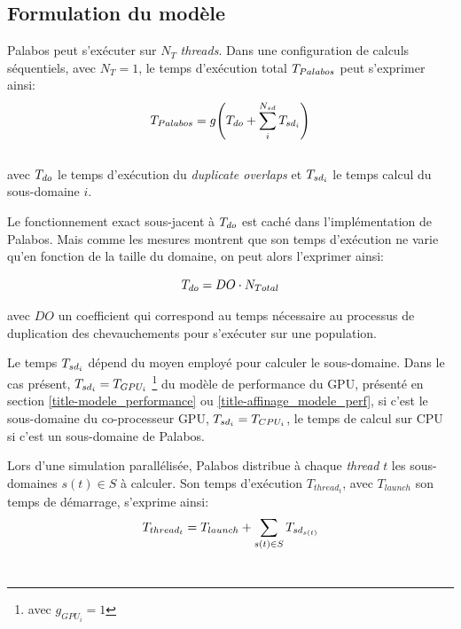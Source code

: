 \subsection{Formulation du modèle}

Palabos peut s'exécuter sur $N_T$ \textit{threads}. Dans une configuration de calculs séquentiels, avec $N_T=1$, le temps d'exécution total $T_{Palabos} $ peut s'exprimer ainsi:
\begin{equation}
T_{Palabos} = g \Bigg(T_{do} + \sum_{i}^{N_{sd}} T_{sd_i} \Bigg) 
\end{equation}\\[-\baselineskip]

avec $T_{do}$ le temps d'exécution du \textit{duplicate overlaps} et $T_{sd_i}$ le temps calcul du sous-domaine $i$.

Le fonctionnement exact sous-jacent à $T_{do}$ est caché dans l'implémentation de Palabos. Mais comme les mesures montrent que son temps d'exécution ne varie qu'en fonction de la taille du domaine, on peut alors l'exprimer ainsi:\\

\newcommand{\docoef}[0]{DO}

\begin{equation}
\Time_{do}  = \docoef \cdot N_{Total}
\end{equation}

\noindent avec $\docoef$ un coefficient qui correspond au temps nécessaire au processus de duplication des chevauchements pour s'exécuter sur une population.

Le temps $T_{sd_i}$ dépend du moyen employé pour calculer le sous-domaine. Dans le cas présent, $T_{sd_i} = T_{GPU_i}$ \footnote{avec $g_{GPU_i}=1$} du modèle de performance du \acs{GPU}, présenté en section \ref{title-modele_performance} ou \ref{title-affinage_modele_perf}, si c'est le sous-domaine du co-processeur \acs{GPU},  $T_{sd_i} = T_{CPU_i}$, le temps de calcul sur \acs{CPU} si c'est un sous-domaine de Palabos.

Lors d'une simulation parallélisée, Palabos distribue à chaque \textit{thread} $t$ les sous-domaines $s(t)\in S$ à calculer. Son temps d'exécution $T_{thread_t}$, avec $T_{launch}$ son temps de démarrage, s'exprime ainsi:
\begin{equation}
T_{thread_t} =  T_{launch} + \sum_{s{(t)}\in S} T_{sd_{s(t)}} 
\end{equation}\\[-\baselineskip]

